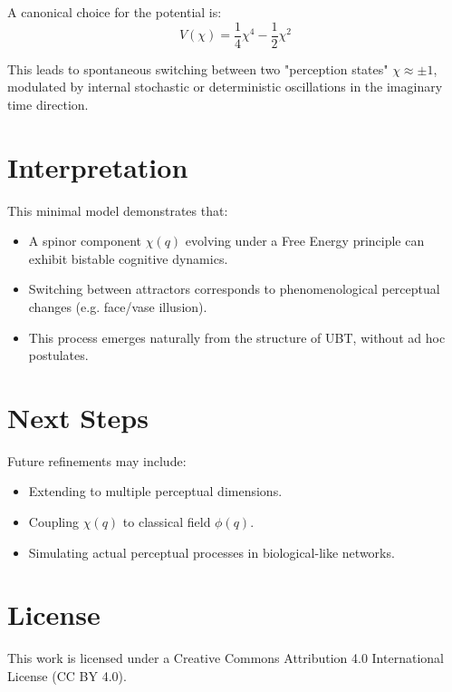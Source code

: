 \documentclass[12pt]{article}
\begin{document}
A canonical choice for the potential is:
\[
V(\chi) = \frac{1}{4} \chi^4 - \frac{1}{2} \chi^2
\]

This leads to spontaneous switching between two "perception states" \(\chi \approx \pm 1\), modulated by internal stochastic or deterministic oscillations in the imaginary time direction.

\section{Interpretation}
This minimal model demonstrates that:
\begin{itemize}
    \item A spinor component \(\chi(q)\) evolving under a Free Energy principle can exhibit bistable cognitive dynamics.
    \item Switching between attractors corresponds to phenomenological perceptual changes (e.g. face/vase illusion).
    \item This process emerges naturally from the structure of UBT, without ad hoc postulates.
\end{itemize}

\section{Next Steps}
Future refinements may include:
\begin{itemize}
    \item Extending to multiple perceptual dimensions.
    \item Coupling \(\chi(q)\) to classical field \(\phi(q)\).
    \item Simulating actual perceptual processes in biological-like networks.
\end{itemize}


\section*{License}
This work is licensed under a Creative Commons Attribution 4.0 International License (CC BY 4.0).
\end{document}

